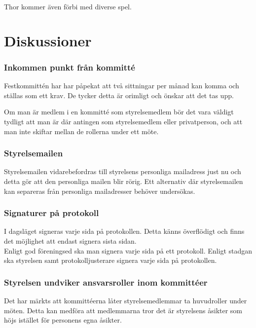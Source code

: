 \documentclass[protokoll]{dvd}
\begin{document}
Thor kommer även förbi med diverse spel.

\newpage






\section{Diskussioner}\label{sec:discussioner}

\subsubsection{Inkommen punkt från kommitté}

Festkommittén har har påpekat att två sittningar per månad kan komma och ställas som ett krav. De tycker detta är orimligt och önskar att det tas upp.

Om man är medlem i en kommitté som styrelsemedlem bör det vara väldigt tydligt att man är där antingen som styrelsemedlem eller privatperson, och att man inte skiftar mellan de rollerna under ett möte.


\subsubsection{Styrelsemailen}

Styrelsemailen vidarebefordras till styrelsens personliga mailadress just nu och detta gör att den personliga mailen blir rörig. Ett alternativ där styrelsemailen kan separeras från personliga mailadresser behöver undersökas.


\subsubsection{Signaturer på protokoll}

I dagsläget signeras varje sida på protokollen. Detta känns överflödigt och finns det möjlighet att endast signera sista sidan.
\\
Enligt god föreningsed ska man signera varje sida på ett protokoll. Enligt stadgan ska styrelsen samt protokolljusterare signera varje sida på protokollen. 

\subsubsection{Styrelsen undviker ansvarsroller inom kommittéer}

Det har märkts att kommittéerna låter styrelsemedlemmar ta huvudroller under möten. Detta kan medföra att medlemmarna tror det är styrelsens åsikter som höjs istället för personens egna åsikter. 
\end{document}
